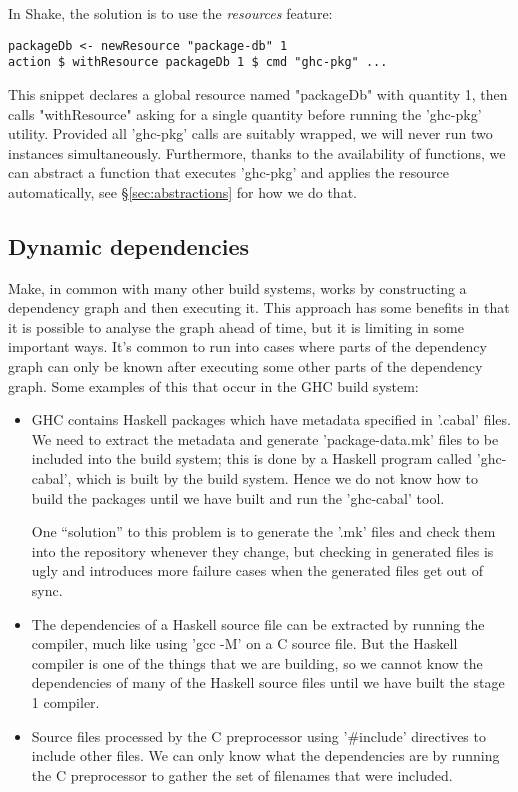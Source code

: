 In Shake, the solution is to use the \emph{resources} feature:

\begin{lstlisting}
packageDb <- newResource "package-db" 1
action $ withResource packageDb 1 $ cmd "ghc-pkg" ...
\end{lstlisting}

This snippet declares a global resource named \lst"packageDb" with quantity 1,
then calls \lst"withResource" asking for a single quantity before running the
\lst'ghc-pkg' utility. Provided all \lst'ghc-pkg' calls are suitably wrapped,
we will never run two instances simultaneously. Furthermore, thanks to the
availability of functions, we can abstract a function that executes
\lst'ghc-pkg' and applies the resource automatically, see
\S\ref{sec:abstractions} for how we do that.

\subsection{Dynamic dependencies\label{sec:dynamic-deps}}

Make, in common with many other build systems, works by
constructing a dependency graph and then executing it. This approach
has some benefits in that it is possible to analyse the graph ahead of
time, but it is limiting in some important ways.  It's common to run
into cases where parts of the dependency graph can only be known after
executing some other parts of the dependency graph.  Some examples of
this that occur in the GHC build system:

\begin{itemize}
\item GHC contains Haskell packages which have metadata specified in
  \lst'.cabal' files. We need to extract the metadata and generate
  \lst'package-data.mk' files to be included into the build system; this
  is done by a Haskell program called \lst'ghc-cabal', which is built by the
  build system. Hence we do not know how to build the packages until we have
  built and run the \lst'ghc-cabal' tool.

  One ``solution'' to this problem is to generate the \lst'.mk'
  files and check them into the repository whenever they change, but
  checking in generated files is ugly and introduces more failure
  cases when the generated files get out of sync.

\item The dependencies of a Haskell source file can be extracted by
  running the compiler, much like using \lst'gcc -M' on a C source
  file.  But the Haskell compiler is one of the things that we are
  building, so we cannot know the dependencies of many of the Haskell
  source files until we have built the stage 1 compiler.

\item Source files processed by the C preprocessor using
  \lst'#include' directives to include other files.  We can only
  know what the dependencies are by running the C preprocessor to
  gather the set of filenames that were included.
\end{itemize}

